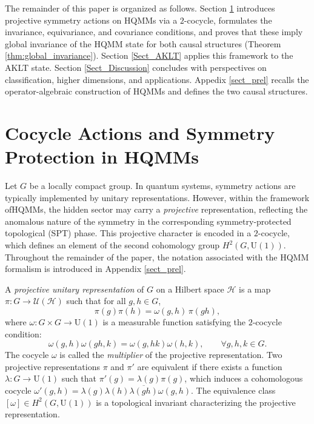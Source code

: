 \documentclass[12pt,a4paper]{article}
\begin{document}
The remainder of this paper is organized as follows.  Section \ref{Sect_main} introduces projective symmetry actions on HQMMs via a $2$-cocycle, formulates the invariance, equivariance, and covariance conditions, and proves that these imply global invariance of the HQMM state for both causal structures (Theorem \ref{thm:global_invariance}). Section \ref{Sect_AKLT} applies this framework to the AKLT state. Section \ref{Sect_Discussion} concludes with perspectives on classification, higher dimensions, and applications. Appedix \ref{sect_prel} recalls the operator-algebraic construction of HQMMs and defines the two causal structures.

  
\section{Cocycle Actions and Symmetry Protection in HQMMs}\label{Sect_main}
Let \(G\) be a locally compact group. In quantum systems, symmetry actions are typically implemented by unitary representations. However, within the framework ofHQMMs, the hidden sector may carry a \textit{projective} representation, reflecting the anomalous nature of the symmetry in the corresponding symmetry-protected topological (SPT) phase. This projective character is encoded in a \(2\)-cocycle, which defines an element of the second cohomology group \(H^2(G, \mathrm{U}(1))\). Throughout the remainder of the paper, the notation associated with the HQMM formalism is introduced in Appendix \ref{sect_prel}.

A \textit{projective unitary representation} of \(G\) on a Hilbert space \(\mathcal{H}\) is a map \(\pi: G \to \mathcal{U}(\mathcal{H})\) such that for all \(g,h \in G\),
\begin{equation}
\pi(g)\pi(h) = \omega(g,h) \, \pi(gh),
\label{eq:proj_repr}
\end{equation}
where \(\omega: G \times G \to \mathrm{U}(1)\) is a measurable function satisfying the \(2\)-cocycle condition:
\begin{equation}
\omega(g,h)\omega(gh,k) = \omega(g,hk)\omega(h,k), \qquad \forall g,h,k \in G.
\label{eq:cocycle_condition}
\end{equation}
The cocycle \(\omega\) is called the \textit{multiplier} of the projective representation. Two projective representations \(\pi\) and \(\pi'\) are equivalent if there exists a function \(\lambda: G \to \mathrm{U}(1)\) such that \(\pi'(g) = \lambda(g)\pi(g)\), which induces a cohomologous cocycle \(\omega'(g,h) = \lambda(g)\lambda(h)\overline{\lambda(gh)}\omega(g,h)\). The equivalence class \([\omega] \in H^2(G, \mathrm{U}(1))\) is a topological invariant characterizing the projective representation.
\end{document}
